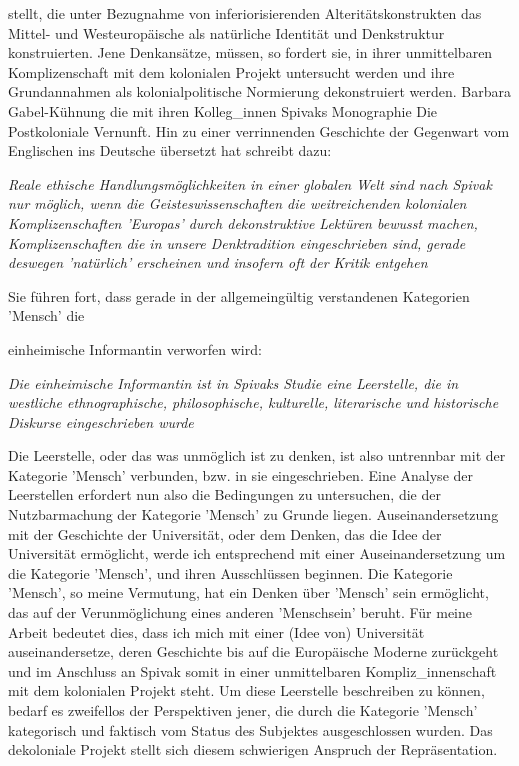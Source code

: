 stellt, die unter Bezugnahme von \glqq inferiorisierenden Alteritätskonstrukten
\grqq das Mittel- und Westeuropäische als natürliche Identität und Denkstruktur
konstruierten. Jene Denkansätze, müssen, so fordert sie, in ihrer unmittelbaren
Komplizenschaft mit dem kolonialen Projekt untersucht werden und ihre
Grundannahmen als kolonialpolitische Normierung dekonstruiert werden.
\footnotemark {}
Barbara Gabel-Kühnung die mit ihren Kolleg\_innen Spivaks Monographie \glqq Die Postkoloniale Vernunft. Hin zu einer verrinnenden
Geschichte der Gegenwart \grqq \footnotemark {} vom Englischen ins Deutsche übersetzt hat schreibt dazu: 
\begin{myenv} 
  \textit{ \glqq Reale ethische
  Handlungsmöglichkeiten in einer globalen Welt sind nach Spivak nur möglich,
wenn die Geisteswissenschaften die weitreichenden kolonialen Komplizenschaften
'Europas' durch dekonstruktive Lektüren bewusst machen, Komplizenschaften die
in unsere Denktradition eingeschrieben sind, gerade deswegen 'natürlich'
erscheinen und insofern oft der Kritik entgehen \grqq \footnotemark
{}} 
\end{myenv} 
Sie führen fort, dass gerade in der allgemeingültig verstandenen Kategorien 'Mensch' die

\glqq einheimische Informantin \grqq verworfen wird:
\begin{myenv} \textit{
    \glqq Die einheimische Informantin ist in Spivaks Studie eine Leerstelle,
die in westliche ethnographische, philosophische, kulturelle, literarische und
historische Diskurse eingeschrieben wurde \grqq \footnotemark {}} 
\end{myenv}

Die Leerstelle, oder das was unmöglich ist zu denken, ist also untrennbar mit
der Kategorie 'Mensch' verbunden, bzw. in sie eingeschrieben. Eine Analyse der
Leerstellen erfordert nun also die Bedingungen zu untersuchen, die der
Nutzbarmachung der Kategorie 'Mensch' zu Grunde liegen. Auseinandersetzung mit
der Geschichte der Universität, oder dem Denken, das die Idee der Universität
ermöglicht, werde ich entsprechend mit einer Auseinandersetzung um die
Kategorie 'Mensch', und ihren Ausschlüssen beginnen. Die Kategorie 'Mensch', so
meine Vermutung, hat ein Denken über 'Mensch' sein ermöglicht, das auf der
Verunmöglichung eines anderen 'Menschsein' beruht. Für meine Arbeit bedeutet
dies, dass ich mich mit einer (Idee von) Universität auseinandersetze, deren
Geschichte bis auf die Europäische Moderne zurückgeht und im Anschluss an
Spivak somit in einer unmittelbaren Kompliz\_innenschaft mit dem kolonialen
Projekt steht. Um diese Leerstelle beschreiben zu können, bedarf es zweifellos
der Perspektiven jener, die durch die Kategorie 'Mensch' kategorisch und
faktisch vom Status des Subjektes ausgeschlossen wurden. Das dekoloniale
Projekt stellt sich diesem schwierigen Anspruch der Repräsentation.

